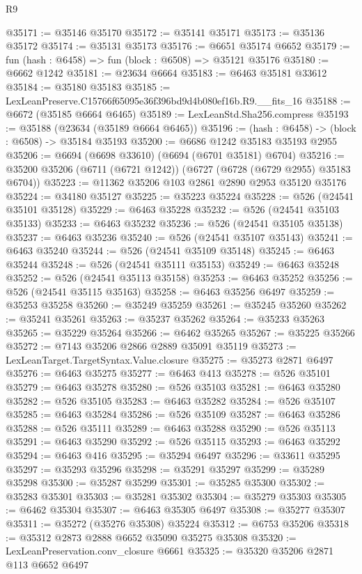 \begin{lexlean}{R9}
\begin{coremodule}
@35171 := @35146 @35170
@35172 := @35141 @35171
@35173 := @35136 @35172
@35174 := @35131 @35173
@35176 := @6651 @35174 @6652
@35179 := fun (hash : @6458) => fun (block : @6508) => @35121 @35176
@35180 := @6662 @1242
@35181 := @23634 @6664
@35183 := @6463 @35181 @33612
@35184 := @35180 @35183
@35185 := LexLeanPreserve.C15766f65095e36f396bd9d4b080ef16b.R9.__fits_16
@35188 := @6672 (@35185 @6664 @6465)
@35189 := LexLeanStd.Sha256.compress
@35193 := @35188 (@23634 (@35189 @6664 @6465))
@35196 := (hash : @6458) -> (block : @6508) -> @35184 @35193
@35200 := @6686 @1242 @35183 @35193 @2955
@35206 := @6694 (@6698 @33610) (@6694 (@6701 @35181) @6704)
@35216 := @35200 @35206 (@6711 (@6721 @1242)) (@6727 (@6728 (@6729 @2955) @35183 @6704))
@35223 := @11362 @35206 @103 @2861 @2890 @2953 @35120 @35176
@35224 := @34180 @35127
@35225 := @35223 @35224
@35228 := @526 (@24541 @35101 @35128)
@35229 := @6463 @35228
@35232 := @526 (@24541 @35103 @35133)
@35233 := @6463 @35232
@35236 := @526 (@24541 @35105 @35138)
@35237 := @6463 @35236
@35240 := @526 (@24541 @35107 @35143)
@35241 := @6463 @35240
@35244 := @526 (@24541 @35109 @35148)
@35245 := @6463 @35244
@35248 := @526 (@24541 @35111 @35153)
@35249 := @6463 @35248
@35252 := @526 (@24541 @35113 @35158)
@35253 := @6463 @35252
@35256 := @526 (@24541 @35115 @35163)
@35258 := @6463 @35256 @6497
@35259 := @35253 @35258
@35260 := @35249 @35259
@35261 := @35245 @35260
@35262 := @35241 @35261
@35263 := @35237 @35262
@35264 := @35233 @35263
@35265 := @35229 @35264
@35266 := @6462 @35265
@35267 := @35225 @35266
@35272 := @7143 @35206 @2866 @2889 @35091 @35119
@35273 := LexLeanTarget.TargetSyntax.Value.closure
@35275 := @35273 @2871 @6497
@35276 := @6463 @35275
@35277 := @6463 @413
@35278 := @526 @35101
@35279 := @6463 @35278
@35280 := @526 @35103
@35281 := @6463 @35280
@35282 := @526 @35105
@35283 := @6463 @35282
@35284 := @526 @35107
@35285 := @6463 @35284
@35286 := @526 @35109
@35287 := @6463 @35286
@35288 := @526 @35111
@35289 := @6463 @35288
@35290 := @526 @35113
@35291 := @6463 @35290
@35292 := @526 @35115
@35293 := @6463 @35292
@35294 := @6463 @416
@35295 := @35294 @6497
@35296 := @33611 @35295
@35297 := @35293 @35296
@35298 := @35291 @35297
@35299 := @35289 @35298
@35300 := @35287 @35299
@35301 := @35285 @35300
@35302 := @35283 @35301
@35303 := @35281 @35302
@35304 := @35279 @35303
@35305 := @6462 @35304
@35307 := @6463 @35305 @6497
@35308 := @35277 @35307
@35311 := @35272 (@35276 @35308) @35224
@35312 := @6753 @35206
@35318 := @35312 @2873 @2888 @6652 @35090 @35275 @35308
@35320 := LexLeanPreservation.conv_closure @6661
@35325 := @35320 @35206 @2871 @113 @6652 @6497

\end{coremodule}
\end{lexlean}

